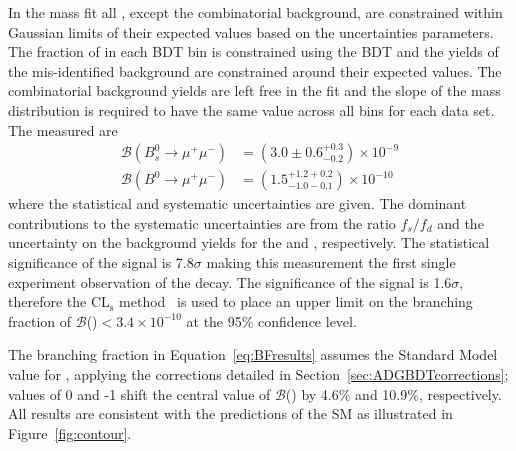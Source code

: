 {{In the mass fit all \pdfs, except the combinatorial background, are constrained within Gaussian limits of their expected values based on the uncertainties \pdf parameters. 
The fraction of \bmumu in each BDT bin is constrained using the BDT \pdf and the yields of the mis-identified background are constrained around their expected values. The combinatorial background yields are left free in the fit and the slope of the mass distribution is required to have the same value across all bins for each data set.
The measured \BFs are
\begin{equation}
\begin{split}
  \mathcal{B}(B^{0}_{s} \to \mu^{+} \mu^{-}) &= (3.0 \pm 0.6^{+0.3}_{-0.2}) \times 10^{-9} \\
  \mathcal{B}(B^{0} \to \mu^{+} \mu^{-}) &= (1.5^{+1.2 +0.2}_{-1.0 -0.1})    \times 10^{-10} 
\end{split}
\label{eq:BFresults}
\end{equation}
where the statistical and systematic uncertainties are given. The dominant contributions to the systematic uncertainties are from the ratio $f_s / f_d$ and the uncertainty on the background yields for the \bsmumu and \bdmumu \BFs, respectively. %
The statistical significance of the \bsmumu signal is 7.8$\sigma$ making this measurement the first single experiment observation of the \bsmumu decay. The significance of the \bdmumu signal is 1.6$\sigma$, therefore the CL$_{\text{s}}$ method~\cite{0954-3899-28-10-313} is used to place an upper limit on the branching fraction of $\mathcal{B}$(\bdmumu)$ < 3.4 \times 10^{-10}$ at the 95$\%$ confidence level.

The \bsmumu branching fraction in Equation~\ref{eq:BFresults} assumes the Standard Model value for \ADG, applying the corrections detailed in Section~\ref{sec:ADGBDTcorrections}; \ADG values of 0 and -1 shift the central value of $\mathcal{B}$(\bsmumu) by 4.6$\%$ and 10.9$\%$, respectively. All results are consistent with the predictions of the SM as illustrated in Figure~\ref{fig:contour}.


}}
